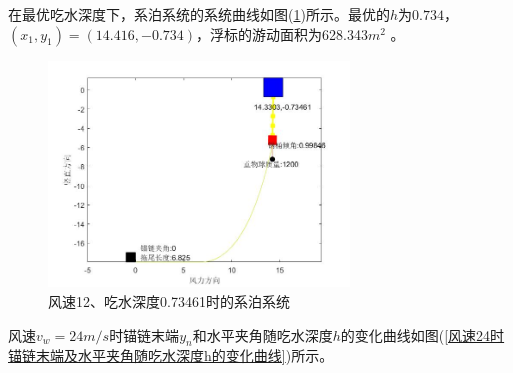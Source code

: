 \documentclass[UTF8]{ctexbook}
\theoremstyle{nonumberplain}
\begin{document}
            在最优吃水深度下，系泊系统的系统曲线如图(\ref{风速12、吃水深度0.73461时的系泊系统})所示。最优的$h$为$0.734 $，$(x_1,y_1)=(14.416,-0.734)$，浮标的游动面积为628.343$m^2$ 。
            \begin{figure}[H]
                \centering
                \includegraphics[width=8cm]{images/v_wind_12_h_xitong.jpg}
                \caption{风速12、吃水深度0.73461时的系泊系统}
                \label{风速12、吃水深度0.73461时的系泊系统}
            \end{figure}
            \par
            风速$v_w=24m/s$时锚链末端$y_n$和水平夹角随吃水深度$h$的变化曲线如图(\ref{风速24时锚链末端及水平夹角随吃水深度h的变化曲线})所示。
\end{document}

